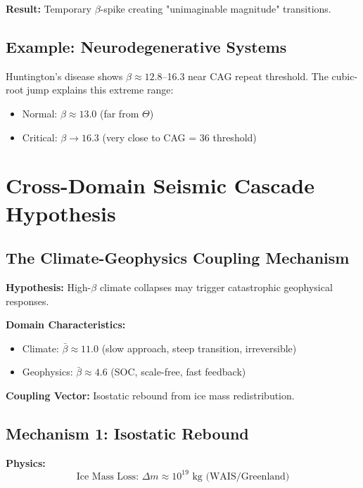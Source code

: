 \documentclass[11pt,a4paper]{article}
\begin{document}
\textbf{Result:} Temporary $\beta$-spike creating "unimaginable magnitude" transitions.

\subsection{Example: Neurodegenerative Systems}

Huntington's disease shows $\beta \approx 12.8$--16.3 near CAG repeat threshold. The cubic-root jump explains this extreme range:

\begin{itemize}
\item Normal: $\beta \approx 13.0$ (far from $\Theta$)
\item Critical: $\beta \to 16.3$ (very close to CAG = 36 threshold)
\end{itemize}

\section{Cross-Domain Seismic Cascade Hypothesis}

\subsection{The Climate-Geophysics Coupling Mechanism}

\textbf{Hypothesis:} High-$\beta$ climate collapses may trigger catastrophic geophysical responses.

\textbf{Domain Characteristics:}
\begin{itemize}
\item Climate: $\bar{\beta} \approx 11.0$ (slow approach, steep transition, irreversible)
\item Geophysics: $\bar{\beta} \approx 4.6$ (SOC, scale-free, fast feedback)
\end{itemize}

\textbf{Coupling Vector:} Isostatic rebound from ice mass redistribution.

\subsection{Mechanism 1: Isostatic Rebound}

\textbf{Physics:}
\begin{equation}
\text{Ice Mass Loss: } \Delta m \approx 10^{19} \text{ kg (WAIS/Greenland)}
\end{equation}
\end{document}
